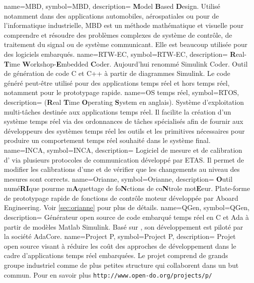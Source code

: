   {
	name=MBD,
	symbol=MBD,
	description=
	{
	  {\bf M}odel {\bf B}ased {\bf D}esign. Utilisé notamment dans des applications
	  automobiles, aérospatiales ou pour de l'informatique industrielle, MBD est un
	  méthode mathématique et visuelle pour comprendre et résoudre des problèmes
	   complexes de système de contrôle, de traitement du signal ou de système
	   communicant. Elle est beaucoup utilisée pour des logiciels embarqués.
	}
}
  {
	name=RTW-EC\up{\circledR},
	symbol=RTW-EC\up{\circledR},
	description=
	{
	  {\bf R}eal-{\bf T}ime {\bf W}orkshop-{\bf E}mbedded {\bf C}oder\up{\circledR}.
	  Aujourd'hui renommé Simulink Coder\up{\texttrademark}. Outil de génération de code
	  C et C++ à partir de diagrammes Simulink\up{\circledR}. Le code généré peut-être
	  utilisé pour des applications temps réel et hors temps réel, notamment pour le
	  prototypage rapide.
	}
}
  {
	name=OS temps réel,
	symbol=RTOS,
	description=
	{
	  ({\bf R}eal {\bf T}ime {\bf O}perating {\bf S}ystem en anglais). Système d'exploitation
	  multi-tâches destinée aux applications temps réel. Il facilite la création d'un système
	  temps réel via des ordonnances de tâches spécialisés afin de fournir aux développeurs
	  des systèmes temps réel les outils et les primitives nécessaires pour produire un
	  comportement temps réel souhaité dans le système final.
	}
}
  {
	name=INCA,
	symbol=INCA,
	description=
	{
	  Logiciel de mesure et de calibration d' via plusieurs protocoles de communication
	  développé par ETAS. Il permet de modifier les calibrations d'une  et de vérifier
	  que les changements au niveau des mesures sont corrects.
	}
}
  {
	name=Orianne,
	symbol=Orianne,
	description=
	{
	  {\bf O}util numé{\bf RI}que pourme m{\bf A}quettage de fo{\bf N}ctions de co{\bf N}trole mot{\bf E}eur.
	  Plate-forme de prototypage rapide de fonctions de contrôle moteur développée par Aboard Engineering. Voir \ref{sec:orianne}
	  pour plus de détails.
	}
}
  {
	name=QGen,
	symbol=QGen,
	description=
	{
	  Générateur open source de code embarqué temps réel en C et Ada à partir de modèles
	  Matlab\up{\textregistered} Simulink\up{\textregistered}. Basé sur
	  , son développement est piloté par la société AdaCore.
	}
}
  {
	name=Project P,
	symbol=Project P,
	description=
	{
	  Projet open source visant à réduire les coût des approches de
	  développement  dans le cadre d'applications temps réel
	  embarquées. Le projet comprend de grands groupe industriel comme de plus
	  petites structure qui collaborent dans un but commun. Pour en savoir plus
	  {\tt http://www.open-do.org/projects/p/}
	}
}
